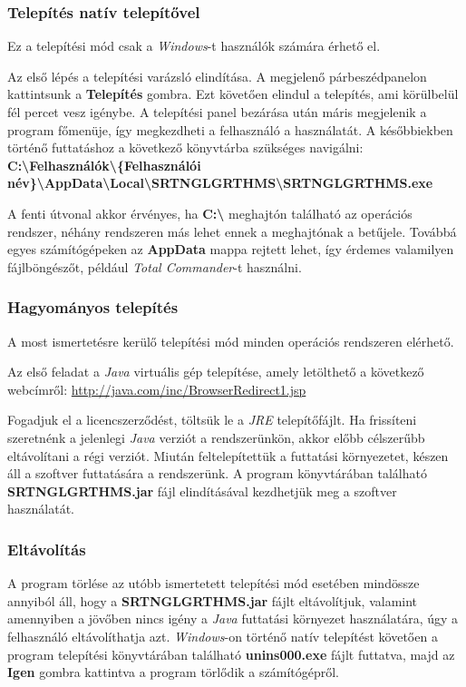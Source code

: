 \documentclass{elteikthesis}
\begin{document}
\subsubsection{Telepítés natív telepítővel}
Ez a telepítési mód csak a \emph{Windows}-t használók számára érhető el.\par
Az első lépés a telepítési varázsló elindítása. A megjelenő párbeszédpanelon kattintsunk a \textbf{Telepítés} gombra. Ezt követően elindul a telepítés, ami körülbelül fél percet vesz igénybe. A telepítési panel bezárása után máris megjelenik a program főmenüje, így megkezdheti a felhasználó a használatát. A későbbiekben történő futtatáshoz a következő könyvtárba szükséges navigálni: \textbf{C:\textbackslash Felhasználók\textbackslash \{Felhasználói név\}\textbackslash AppData\textbackslash Local\textbackslash SRTNGLGRTHMS\textbackslash SRTNGLGRTHMS.exe} \par
A fenti útvonal akkor érvényes, ha \textbf{C:\textbackslash} meghajtón található az operációs rendszer, néhány rendszeren más lehet ennek a meghajtónak a betűjele. Továbbá egyes számítógépeken az \textbf{AppData} mappa rejtett lehet, így érdemes valamilyen fájlböngészőt, például \emph{Total Commander}-t használni.

\subsubsection{Hagyományos telepítés}
A most ismertetésre kerülő telepítési mód minden operációs rendszeren elérhető.\par
Az első feladat a \emph{Java} virtuális gép telepítése, amely letölthető a következő webcímről: \url{http://java.com/inc/BrowserRedirect1.jsp}\par
Fogadjuk el a licencszerződést, töltsük le a \emph{JRE} telepítőfájlt. Ha frissíteni szeretnénk a jelenlegi \emph{Java} verziót a rendszerünkön, akkor előbb célszerűbb eltávolítani a régi verziót. Miután feltelepítettük a futtatási környezetet,  készen áll a szoftver futtatására a rendszerünk. A program könyvtárában található \textbf{SRTNGLGRTHMS.jar} fájl elindításával kezdhetjük meg a szoftver használatát.

\subsubsection{Eltávolítás}
A program törlése az utóbb ismertetett telepítési mód esetében mindössze annyiból áll, hogy a \textbf{SRTNGLGRTHMS.jar} fájlt eltávolítjuk, valamint amennyiben a jövőben nincs igény a \emph{Java} futtatási környezet használatára, úgy a felhasználó eltávolíthatja azt.
\emph{Windows}-on történő natív telepítést követően a program telepítési könyvtárában található \textbf{unins000.exe} fájlt futtatva, majd az \textbf{Igen} gombra kattintva a program törlődik a számítógépről.
\end{document}
